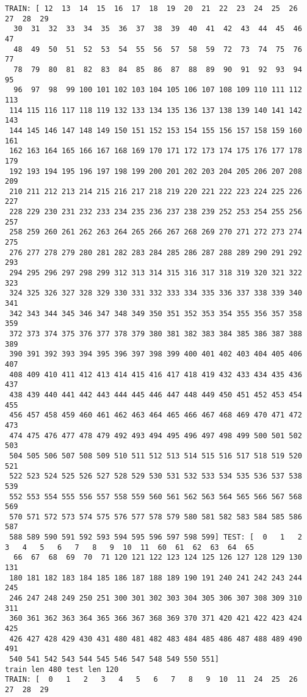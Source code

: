 \documentclass[11pt]{article}
\begin{document}
    \begin{Verbatim}[commandchars=\\\{\}]
TRAIN: [ 12  13  14  15  16  17  18  19  20  21  22  23  24  25  26  27  28  29
  30  31  32  33  34  35  36  37  38  39  40  41  42  43  44  45  46  47
  48  49  50  51  52  53  54  55  56  57  58  59  72  73  74  75  76  77
  78  79  80  81  82  83  84  85  86  87  88  89  90  91  92  93  94  95
  96  97  98  99 100 101 102 103 104 105 106 107 108 109 110 111 112 113
 114 115 116 117 118 119 132 133 134 135 136 137 138 139 140 141 142 143
 144 145 146 147 148 149 150 151 152 153 154 155 156 157 158 159 160 161
 162 163 164 165 166 167 168 169 170 171 172 173 174 175 176 177 178 179
 192 193 194 195 196 197 198 199 200 201 202 203 204 205 206 207 208 209
 210 211 212 213 214 215 216 217 218 219 220 221 222 223 224 225 226 227
 228 229 230 231 232 233 234 235 236 237 238 239 252 253 254 255 256 257
 258 259 260 261 262 263 264 265 266 267 268 269 270 271 272 273 274 275
 276 277 278 279 280 281 282 283 284 285 286 287 288 289 290 291 292 293
 294 295 296 297 298 299 312 313 314 315 316 317 318 319 320 321 322 323
 324 325 326 327 328 329 330 331 332 333 334 335 336 337 338 339 340 341
 342 343 344 345 346 347 348 349 350 351 352 353 354 355 356 357 358 359
 372 373 374 375 376 377 378 379 380 381 382 383 384 385 386 387 388 389
 390 391 392 393 394 395 396 397 398 399 400 401 402 403 404 405 406 407
 408 409 410 411 412 413 414 415 416 417 418 419 432 433 434 435 436 437
 438 439 440 441 442 443 444 445 446 447 448 449 450 451 452 453 454 455
 456 457 458 459 460 461 462 463 464 465 466 467 468 469 470 471 472 473
 474 475 476 477 478 479 492 493 494 495 496 497 498 499 500 501 502 503
 504 505 506 507 508 509 510 511 512 513 514 515 516 517 518 519 520 521
 522 523 524 525 526 527 528 529 530 531 532 533 534 535 536 537 538 539
 552 553 554 555 556 557 558 559 560 561 562 563 564 565 566 567 568 569
 570 571 572 573 574 575 576 577 578 579 580 581 582 583 584 585 586 587
 588 589 590 591 592 593 594 595 596 597 598 599] TEST: [  0   1   2   3   4   5   6   7   8   9  10  11  60  61  62  63  64  65
  66  67  68  69  70  71 120 121 122 123 124 125 126 127 128 129 130 131
 180 181 182 183 184 185 186 187 188 189 190 191 240 241 242 243 244 245
 246 247 248 249 250 251 300 301 302 303 304 305 306 307 308 309 310 311
 360 361 362 363 364 365 366 367 368 369 370 371 420 421 422 423 424 425
 426 427 428 429 430 431 480 481 482 483 484 485 486 487 488 489 490 491
 540 541 542 543 544 545 546 547 548 549 550 551]
train len 480 test len 120
TRAIN: [  0   1   2   3   4   5   6   7   8   9  10  11  24  25  26  27  28  29

\end{Verbatim}
\end{document}
